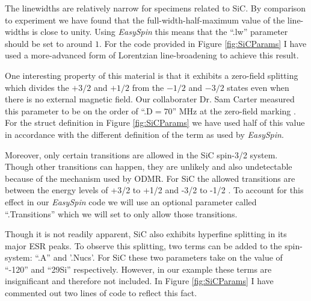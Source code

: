 \documentclass[oneside, noacknowlegments]{BYUPhys}
\begin{document}
The linewidths are relatively narrow for specimens related to SiC. By comparison to experiment we have found that the full-width-half-maximum value of the line-widths is close to unity. Using \textit{EasySpin} this means that the ``.lw'' parameter should be set to around $1$. For the code provided in Figure \ref{fig:SiCParams} I have used a more-advanced form of Lorentzian line-broadening to achieve this result.

One interesting property of this material is that it exhibits a zero-field splitting which divides the $+3/2$ and $+1/2$ from the $-1/2$ and $-3/2$ states even when there is no external magnetic field. Our collaborater Dr. Sam Carter measured this parameter to be on the order of ``.D$=70$'' MHz at the zero-field marking \cite{RefWorks:doc:5892964ee4b0499fa95c5108}. For the struct definition in Figure \ref{fig:SiCParams} we have used half of this value in accordance with the different definition of the term as used by \textit{EasySpin}.

Moreover, only certain transitions are allowed in the SiC spin-3/2 system. Though other transitions can happen, they are unlikely and also undetectable because of the mechanism used by ODMR. For SiC the allowed transitions are between the energy levels of +3/2 to +1/2 and -3/2 to -1/2 \cite{RefWorks:doc:5892964ee4b0499fa95c5108}. To account for this effect in our \textit{EasySpin} code we will use an optional parameter called ``.Transitions'' which we will set to only allow those transitions.

Though it is not readily apparent, SiC also exhibits hyperfine splitting in its major ESR peaks. To observe this splitting, two terms can be added to the spin-system: ``.A'' and '.Nucs'. For SiC these two parameters take on the value of ``-120'' and ``29Si'' respectively. However, in our example these terms are insignificant and therefore not included. In Figure \ref{fig:SiCParams} I have commented out two lines of code to reflect this fact.
\end{document}
